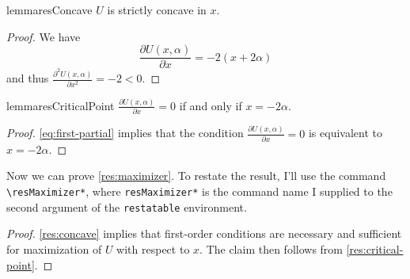 \documentclass[12pt]{article}
\begin{document}
\begin{restatable}{lemma}{resConcave}
  \label{res:concave}
  $U$ is strictly concave in $x$.
\end{restatable}

\begin{proof}
  We have
  \begin{equation}
    \label{eq:first-partial}
    \frac{\partial U(x, \alpha)}{\partial x} = -2 (x + 2 \alpha)
  \end{equation}
  and thus $\frac{\partial^2 U(x, \alpha)}{\partial x^2} = -2 < 0$.
\end{proof}

\begin{restatable}{lemma}{resCriticalPoint}
  \label{res:critical-point}
  $\frac{\partial U(x, \alpha)}{\partial x} = 0$ if and only if $x = -2 \alpha$.
\end{restatable}

\begin{proof}
  \autoref{eq:first-partial} implies that the condition $\frac{\partial U(x, \alpha)}{\partial x} = 0$ is equivalent to $x = -2 \alpha$.
\end{proof}

Now we can prove \autoref{res:maximizer}.
To restate the result, I'll use the command \verb|\resMaximizer*|, where \verb|resMaximizer*| is the command name I supplied to the second argument of the \verb|restatable| environment.

\resMaximizer*

\begin{proof}
  \autoref{res:concave} implies that first-order conditions are necessary and sufficient for maximization of $U$ with respect to $x$.
  The claim then follows from \autoref{res:critical-point}.
\end{proof}

{}
\singlespacing
{}
\end{document}
